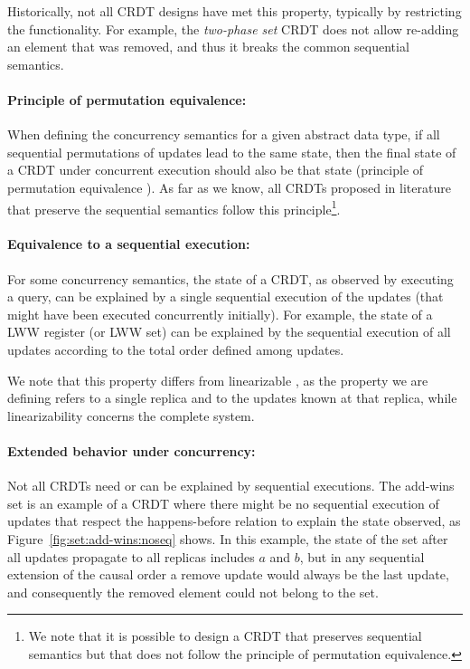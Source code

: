 \documentclass[11pt,a4paper]{article}
\begin{document}
Historically, not all CRDT designs have met this property, typically by restricting
the functionality. 
For example, the \emph{two-phase set} CRDT \cite{Shapiro11Conflict} does not allow 
re-adding an element that was removed, and thus it breaks the common sequential 
semantics.

\paragraph{Principle of permutation equivalence:}
When defining the concurrency semantics for a given abstract data type, 
if all sequential permutations of updates
lead to the same state, then the final state of a CRDT under concurrent 
execution should also be that state
(principle of permutation equivalence \cite{Bieniusa12Semantics}).
As far as we know, all CRDTs proposed in literature that preserve the 
sequential semantics follow this principle\footnote{We note that it is possible
to design a CRDT that preserves sequential semantics but that does not
follow the principle of permutation equivalence.}.

\paragraph{Equivalence to a sequential execution:}
For some concurrency semantics, the state of a CRDT, as observed by executing 
a query, can be explained by a single sequential execution of the
updates (that might have been executed concurrently initially).
For example, the state of a LWW register (or LWW set) can be explained by
the sequential execution of all updates according to the total order 
defined among updates.

We note that this property differs from linearizable \cite{linearizability}, as
the property we are defining refers to a single replica and to the updates known 
at that replica, while linearizability concerns the complete system.

\paragraph{Extended behavior under concurrency:}
Not all CRDTs need or can be explained by sequential executions. 
The add-wins set is an example of a CRDT where there might be no sequential 
execution of updates that respect the happens-before relation to explain the state observed, 
as Figure~\ref{fig:set:add-wins:noseq} shows.
In this example, the state of the set after all updates propagate to all 
replicas includes $a$ and $b$, but in any sequential extension of the causal 
order a remove update would always be the last update, and consequently 
the removed element could not belong to the set.
\end{document}
